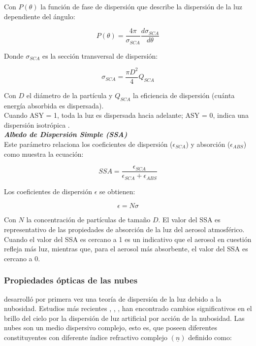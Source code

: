 Con $P(\theta)$ la función de fase de dispersión que describe la dispersión de la luz dependiente del ángulo:

\begin{equation}
P(\theta) = \frac{4\pi}{\sigma_{SCA}} \frac{d\sigma_{SCA}}{d\theta}
\end{equation}

Donde $\sigma_{SCA}$ es la sección transversal de dispersión:

\begin{equation}
\sigma_{SCA} = \frac{\pi D^{2}}{4} Q_{SCA}
\end{equation}

Con $D$ el diámetro de la partícula y $Q_{SCA}$ la eficiencia de dispersión (cuánta energía absorbida es dispersada).\\

Cuando ASY = 1, toda la luz es dispersada hacia adelante; ASY = 0, indica una dispersión isotrópica \citep{Solano2015}.
\\

\textit{\textbf{Albedo de Dispersión Simple (SSA)}}\\

Este parámetro relaciona los coeficientes de dispersión ($\epsilon_{SCA}$) y absorción ($\epsilon_{ABS}$) \citep{Foot1987} como muestra la ecuación:

\begin{equation}
SSA = \frac{\epsilon_{SCA}}{\epsilon_{SCA} + \epsilon_{ABS}}
\end{equation}


Los coeficientes de dispersión $\epsilon$ se obtienen:

\begin{equation}
\epsilon = N \sigma
\end{equation}

Con $N$ la concentración de partículas de tamaño $D$. El valor del SSA es representativo de las propiedades de absorción de la luz del aerosol atmosférico. Cuando el valor del SSA es cercano a 1 es un indicativo que el aerosol en cuestión refleja más luz, mientras que, para el aerosol más absorbente, el valor del SSA es cercano a 0.\\

\subsubsection{Propiedades ópticas de las nubes}

\cite{Twomey1967} desarrolló por primera vez una teoría de dispersión de la luz debido a la nubosidad. Estudios más recientes \citep{Kocifaj2007}, \citep{Solano2014}, \citep{Solano2015}, han encontrado cambios significativos en el brillo del cielo por la dispersión de luz artificial por acción de la nubosidad. Las nubes son un medio dispersivo complejo, esto es, que poseen diferentes constituyentes con diferente índice refractivo complejo $(\underline{n})$ definido como:


